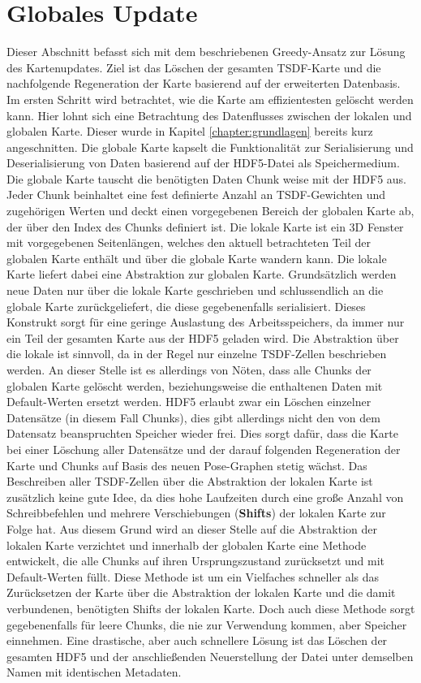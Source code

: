\section{Globales Update}
\label{section:global_update}

Dieser Abschnitt befasst sich mit dem beschriebenen Greedy-Ansatz zur Lösung des Kartenupdates. Ziel ist das Löschen der gesamten TSDF-Karte und die nachfolgende Regeneration der Karte basierend auf der erweiterten Datenbasis. Im ersten Schritt wird betrachtet, wie die Karte am effizientesten gelöscht werden kann. Hier lohnt sich eine Betrachtung des Datenflusses zwischen der lokalen und globalen Karte. Dieser wurde in Kapitel \ref{chapter:grundlagen} bereits kurz angeschnitten. Die globale Karte kapselt die Funktionalität zur Serialisierung und Deserialisierung von Daten basierend auf der HDF5-Datei als Speichermedium. Die globale Karte tauscht die benötigten Daten Chunk weise mit der HDF5 aus. Jeder Chunk beinhaltet eine fest definierte Anzahl an TSDF-Gewichten und zugehörigen Werten und deckt einen vorgegebenen Bereich der globalen Karte ab, der über den Index des Chunks definiert ist. Die lokale Karte ist ein 3D Fenster mit vorgegebenen Seitenlängen, welches den aktuell betrachteten Teil der globalen Karte enthält und über die globale Karte wandern kann. Die lokale Karte liefert dabei eine Abstraktion zur globalen Karte. Grundsätzlich werden neue Daten nur über die lokale Karte geschrieben und schlussendlich an die globale Karte zurückgeliefert, die diese gegebenenfalls serialisiert. Dieses Konstrukt sorgt für eine geringe Auslastung des Arbeitsspeichers, da immer nur ein Teil der gesamten Karte aus der HDF5 geladen wird. Die Abstraktion über die lokale ist sinnvoll, da in der Regel nur einzelne TSDF-Zellen beschrieben werden. An dieser Stelle ist es allerdings von Nöten, dass alle Chunks der globalen Karte gelöscht werden, beziehungsweise die enthaltenen Daten mit Default-Werten ersetzt werden. HDF5 erlaubt zwar ein Löschen einzelner Datensätze (in diesem Fall Chunks), dies gibt allerdings nicht den von dem Datensatz beanspruchten Speicher wieder frei. Dies sorgt dafür, dass die Karte bei einer Löschung aller Datensätze und der darauf folgenden Regeneration der Karte und Chunks auf Basis des neuen Pose-Graphen stetig wächst. Das Beschreiben aller TSDF-Zellen über die Abstraktion der lokalen Karte ist zusätzlich keine gute Idee, da dies hohe Laufzeiten durch eine große Anzahl von Schreibbefehlen und mehrere Verschiebungen (\textbf{Shifts}) der lokalen Karte zur Folge hat. Aus diesem Grund wird an dieser Stelle auf die Abstraktion der lokalen Karte verzichtet und innerhalb der globalen Karte eine Methode entwickelt, die alle Chunks auf ihren Ursprungszustand zurücksetzt und mit Default-Werten füllt. Diese Methode ist um ein Vielfaches schneller als das Zurücksetzen der Karte über die Abstraktion der lokalen Karte und die damit verbundenen, benötigten Shifts der lokalen Karte. Doch auch diese Methode sorgt gegebenenfalls für leere Chunks, die nie zur Verwendung kommen, aber Speicher einnehmen. Eine drastische, aber auch schnellere Lösung ist das Löschen der gesamten HDF5 und der anschließenden Neuerstellung der Datei unter demselben Namen mit identischen Metadaten. 